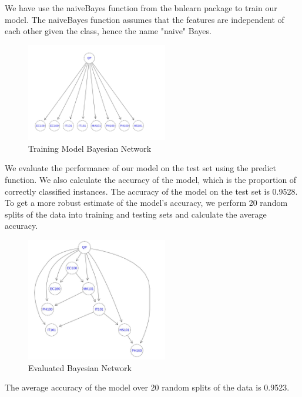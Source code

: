 \documentclass[15pt,journal]{IEEEtran}
\begin{document}
We have use the naiveBayes function from the bnlearn package to train our model. The naiveBayes function assumes that the features are independent of each other given the class, hence the name "naive" Bayes.
\begin{figure}[H]%
\begin {center}
\includegraphics[width=0.55\textwidth]{image/Bayesian_Network_Placement.jpg}
\caption{Training Model Bayesian Network} %
\label{fig:ecg}
\end {center}
\end{figure}
We evaluate the performance of our model on the test set using the predict function. We also calculate the accuracy of the model, which is the proportion of correctly classified instances.
The accuracy of the model on the test set is 0.9528.
To get a more robust estimate of the model's accuracy, we perform 20 random splits of the data into training and testing sets and calculate the average accuracy.
\begin{figure}[H]%
\begin {center}
\includegraphics[width=0.55\textwidth]{image/Bayesian_Network_Placement_evaluated.jpg}
\caption{Evaluated Bayesian Network} %
\label{fig:ecg}
\end {center}
\end{figure}
The average accuracy of the model over 20 random splits of the data is 0.9523.
\end{document}
